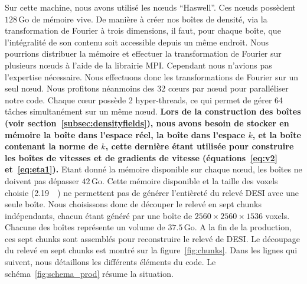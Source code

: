 \documentclass[11pt, twoside, a4paper, openright]{report}
\begin{document}
Sur cette machine, nous avons utilisé les n{\oe}uds ``Haswell''.
Ces n{\oe}uds possèdent $\num{128}\,\mathrm{Go}$ de mémoire vive. De manière à créer nos boîtes de densité, via la transformation de Fourier à trois dimensions, il faut, pour chaque boîte, que l'intégralité de son contenu soit accessible depuis un même endroit.
Nous pourrions distribuer la mémoire et effectuer la transformation de Fourier sur plusieurs n{\oe}uds à l'aide de la librairie MPI.
Cependant nous n'avions pas l'expertise nécessaire. Nous effectuons donc les transformations de Fourier sur un seul n{\oe}ud.
Nous profitons néanmoins des \num{32} c{\oe}urs par n{\oe}ud pour paralléliser notre code. Chaque c{\oe}ur possède 2 hyper-threads, ce qui permet de gérer 64 tâches simultanément sur un même n{\oe}ud.
\textbf{Lors de la construction des boîtes (voir section~\ref{subsec:densityfields}), nous avons besoin de stocker en mémoire la boîte dans l'espace réel, la boîte dans l'espace $k$, et la boîte contenant la norme de $k$, cette dernière étant utilisée pour construire les boîtes de vitesses et de gradients de vitesse (équations~\ref{eq:v2} et~\ref{eq:eta1}).}
Etant donné la mémoire disponible sur chaque n{\oe}ud, les boîtes ne doivent pas dépasser $\num{42}\,\mathrm{Go}$. Cette mémoire disponible et la taille des voxels choisie (\SI{2.19}{\perh\Mpc}) ne permettent pas de générer l'entièreté du relevé DESI avec une seule boîte.
Nous choisissons donc de découper le relevé en sept chunks indépendants, chacun étant généré par une boîte de $\num{2560}\times\num{2560}\times\num{1536}$ voxels. Chacune des boîtes représente un volume de $\num{37.5}\,\mathrm{Go}$. A la fin de la production, ces sept chunks sont assemblés pour reconstruire le relevé de DESI. Le découpage du relevé en sept chunks est montré sur la figure~\ref{fig:chunks}.
Dans les lignes qui suivent, nous détaillons les différents éléments du code.
Le schéma~\ref{fig:schema_prod} résume la situation.
\end{document}
